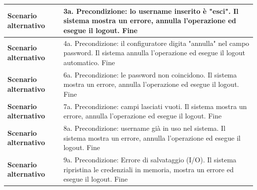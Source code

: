 \documentclass[12pt, a4paper, oneside]{report}
\begin{document}
\begin{tabularx}{\textwidth}{|l|X|}
    \textbf{Scenario alternativo} & 
    3a. Precondizione: lo username inserito è "esci".\newline
    Il sistema mostra un errore, annulla l'operazione ed esegue il logout.\newline
    Fine \\ \hline

    \textbf{Scenario alternativo} & 
    4a. Precondizione: il configuratore digita "annulla" nel campo password.\newline
    Il sistema annulla l'operazione ed esegue il logout automatico.\newline
    Fine \\ \hline

    \textbf{Scenario alternativo} & 
    6a. Precondizione: le password non coincidono.\newline
    Il sistema mostra un errore, annulla l'operazione ed esegue il logout.\newline
    Fine \\ \hline

    \textbf{Scenario alternativo} & 
    7a. Precondizione: campi lasciati vuoti.\newline
    Il sistema mostra un errore, annulla l'operazione ed esegue il logout.\newline
    Fine \\ \hline

    \textbf{Scenario alternativo} & 
    8a. Precondizione: username già in uso nel sistema.\newline
    Il sistema mostra un errore, annulla l'operazione ed esegue il logout.\newline
    Fine \\ \hline

    \textbf{Scenario alternativo} & 
    9a. Precondizione: Errore di salvataggio (I/O).\newline
    Il sistema ripristina le credenziali in memoria, mostra un errore ed esegue il logout.\newline
    Fine \\ \hline
\end{tabularx}

\renewcommand{\arraystretch}{1.4} 
\end{document}
